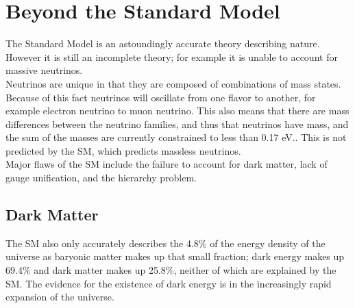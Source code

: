 		
		





\section{Beyond the Standard Model}

The Standard Model is an astoundingly accurate theory describing nature.  However it is still an incomplete theory; for example it is unable to account for massive neutrinos. \\%


Neutrinos are unique in that they are composed of combinations of mass states.  Because of this fact neutrinos will oscillate from one flavor to another\cite{SuperKneutrinos}, for example electron neutrino to muon neutrino.  This also means that there are mass differences between the neutrino families, and thus that neutrinos have mass, and the sum of the masses are currently constrained to less than 0.17 eV.\cite{pdg}.  This is not predicted by the SM, which predicts massless neutrinos. \\

Major flaws of the SM include the failure to account for dark matter, lack of gauge unification, and the hierarchy problem.  \\

\subsection{Dark Matter}

The SM also only accurately describes the 4.8\% of the energy density of the universe as baryonic matter makes up that small fraction; dark energy makes up 69.4\% and dark matter makes up 25.8\%\cite{planckpaper}, neither of which are explained by the SM.  The evidence for the existence of dark energy is in the increasingly rapid expansion of the universe.  \\

